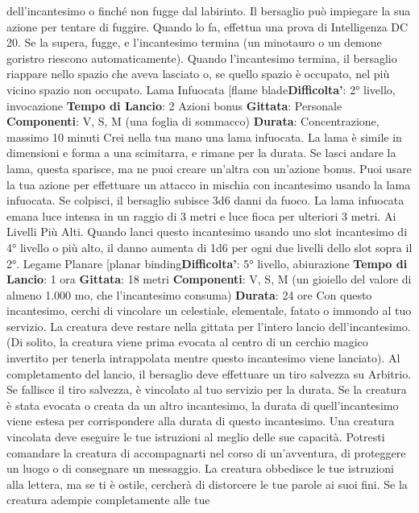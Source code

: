 \begin{multicols}{2}
dell’incantesimo o finché non fugge dal labirinto.
Il bersaglio può impiegare la sua azione per tentare di
fuggire. Quando lo fa, effettua una prova di Intelligenza
DC 20. Se la supera, fugge, e l’incantesimo termina (un
minotauro o un demone goristro riescono
automaticamente).
Quando l’incantesimo termina, il bersaglio riappare
nello spazio che aveva lasciato o, se quello spazio è
occupato, nel più vicino spazio non occupato.
Lama Infuocata
[flame blade\textbf{Difficolta'}:
2° livello, invocazione
\textbf{Tempo di Lancio}: 2 Azioni bonus
\textbf{Gittata}: Personale
\textbf{Componenti}: V, S, M (una foglia di sommacco)
\textbf{Durata}: Concentrazione, massimo 10 minuti
Crei nella tua mano una lama infuocata. La lama è
simile in dimensioni e forma a una scimitarra, e rimane
per la durata. Se lasci andare la lama, questa sparisce,
ma ne puoi creare un’altra con un’azione bonus.
Puoi usare la tua azione per effettuare un attacco in
mischia con incantesimo usando la lama infuocata. Se
colpisci, il bersaglio subisce 3d6 danni da fuoco.
La lama infuocata emana luce intensa in un raggio di 3
metri e luce fioca per ulteriori 3 metri.
Ai Livelli Più Alti. Quando lanci questo incantesimo
usando uno slot incantesimo di 4° livello o più alto, il
danno aumenta di 1d6 per ogni due livelli dello slot
sopra il 2°.
Legame Planare
[planar binding\textbf{Difficolta'}:
5° livello, abiurazione
\textbf{Tempo di Lancio}: 1 ora
\textbf{Gittata}: 18 metri
\textbf{Componenti}: V, S, M (un gioiello del valore di almeno
1.000 mo, che l’incantesimo consuma)
\textbf{Durata}: 24 ore
Con questo incantesimo, cerchi di vincolare un
celestiale, elementale, fatato o immondo al tuo servizio.
La creatura deve restare nella gittata per l’intero lancio
dell’incantesimo. (Di solito, la creatura viene prima
evocata al centro di un cerchio magico invertito per
tenerla intrappolata mentre questo incantesimo viene
lanciato). Al completamento del lancio, il bersaglio deve
effettuare un tiro salvezza su Arbitrio. Se fallisce il tiro
salvezza, è vincolato al tuo servizio per la durata. Se la
creatura è stata evocata o creata da un altro
incantesimo, la durata di quell’incantesimo viene estesa
per corrispondere alla durata di questo incantesimo.
Una creatura vincolata deve eseguire le tue istruzioni al
meglio delle sue capacità. Potresti comandare la
creatura di accompagnarti nel corso di un’avventura, di
proteggere un luogo o di consegnare un messaggio. La
creatura obbedisce le tue istruzioni alla lettera, ma se ti
è ostile, cercherà di distorcere le tue parole ai suoi fini.
Se la creatura adempie completamente alle tue

\end{multicols}
